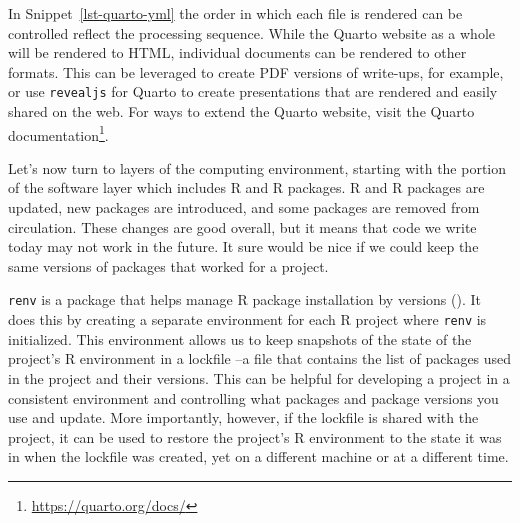 \documentclass[
  letterpaper,
]{latex/krantz}
\theoremstyle{definition}
\theoremstyle{remark}
\DeclareRobustCommand{\href}[2]{#2\footnote{\url{#1}}}
\begin{document}
\begin{codelisting}

\caption{\label{lst-quarto-yml}Quarto *\_quarto.yml* file}


\end{codelisting}%

In Snippet~\ref{lst-quarto-yml} the order in which each file is rendered
can be controlled reflect the processing sequence. While the Quarto
website as a whole will be rendered to HTML, individual documents can be
rendered to other formats. This can be leveraged to create PDF versions
of write-ups, for example, or use \texttt{revealjs} for Quarto to create
presentations that are rendered and easily shared on the web. For ways
to extend the Quarto website, visit the
\href{https://quarto.org/docs/}{Quarto documentation}.

Let's now turn to layers of the computing environment, starting with the
portion of the software layer which includes R and R packages. R and R
packages are updated, new packages are introduced, and some packages are
removed from circulation. These changes are good overall, but it means
that code we write today may not work in the future. It sure would be
nice if we could keep the same versions of packages that worked for a
project.

\texttt{renv} is a package that helps manage R package installation by
versions (). It does this
by creating a separate environment for each R project where
\texttt{renv} is initialized. This environment allows us to keep
snapshots of the state of the project's R environment in a lockfile --a
file that contains the list of packages used in the project and their
versions. This can be helpful for developing a project in a consistent
environment and controlling what packages and package versions you use
and update. More importantly, however, if the lockfile is shared with
the project, it can be used to restore the project's R environment to
the state it was in when the lockfile was created, yet on a different
machine or at a different time.
\end{document}
